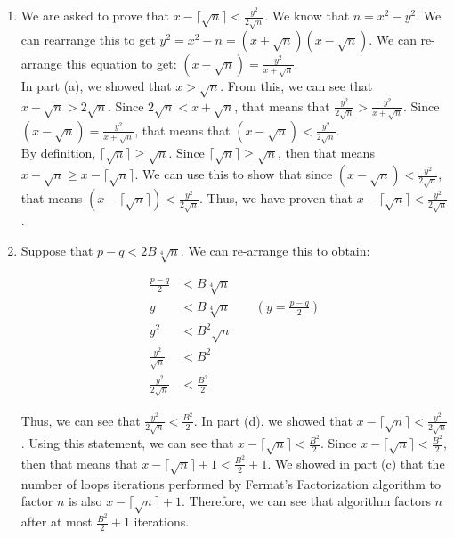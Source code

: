 \documentclass[11pt]{article}
\theoremstyle{definition}
\begin{document}
\begin{enumerate}
\begin{enumerate}
\item  %
We are asked to prove that $x - \lceil \sqrt{n} \rceil < \frac{y^2}{2\sqrt{n}}$. We know that $n = x^2 - y^2$. We can rearrange this to get $y^2 = x^2 - n = (x + \sqrt{n})(x - \sqrt{n})$. We can re-arrange this equation to get: $(x - \sqrt{n}) = \frac{y^2}{x + \sqrt{n}}$. \\

In part (a), we showed that $x > \sqrt{n}$. From this, we can see that $x + \sqrt{n} > 2\sqrt{n}$. Since $2\sqrt{n} < x + \sqrt{n}$, that means that $\frac{y^2}{2\sqrt{n}} > \frac{y^2}{x + \sqrt{n}}$. Since $(x - \sqrt{n}) = \frac{y^2}{x + \sqrt{n}}$, that means that $(x - \sqrt{n}) < \frac{y^2}{2\sqrt{n}}$. \\

By definition, $\lceil \sqrt{n} \rceil \geq \sqrt{n}$. Since $\lceil \sqrt{n} \rceil \geq \sqrt{n}$, then that means $x - \sqrt{n} \geq x - \lceil \sqrt{n} \rceil$. We can use this to show that since $(x - \sqrt{n}) < \frac{y^2}{2\sqrt{n}}$, that means $(x - \lceil \sqrt{n} \rceil) < \frac{y^2}{2\sqrt{n}}$. Thus, we have proven that $x - \lceil \sqrt{n} \rceil < \frac{y^2}{2\sqrt{n}}$.
\\

\item  %
Suppose that $p - q < 2B\sqrt[4]{n}$. We can re-arrange this to obtain:

\begin{align*}
    \frac{p - q}{2} &< B\sqrt[4]{n} \\
    y &< B\sqrt[4]{n} \quad \quad (y = \frac{p - q}{2}) \\
    y^2 &< B^2\sqrt{n} \\
    \frac{y^2}{\sqrt{n}} &< B^2 \\
    \frac{y^2}{2\sqrt{n}} &< \frac{B^2}{2}
\end{align*}

Thus, we can see that $\frac{y^2}{2\sqrt{n}} < \frac{B^2}{2}$. In part (d), we showed that $x - \lceil \sqrt{n} \rceil < \frac{y^2}{2\sqrt{n}}$. Using this statement, we can see that $x - \lceil \sqrt{n} \rceil < \frac{B^2}{2}$. Since $x - \lceil \sqrt{n} \rceil < \frac{B^2}{2}$, then that means that $x - \lceil \sqrt{n} \rceil + 1 < \frac{B^2}{2} + 1$. We showed in part (c) that the number of loops iterations performed by Fermat's Factorization algorithm to factor $n$ is also $x - \lceil \sqrt{n} \rceil + 1$. Therefore, we can see that algorithm factors $n$ after at most $\frac{B^2}{2} + 1$ iterations. 


\end{enumerate}
\end{enumerate}
\end{document}
